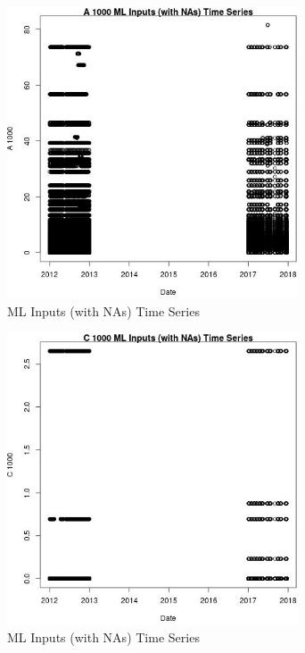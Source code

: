 \begin{figure} 
\centering  
\includegraphics[width=0.77\textwidth]{Code_Outputs/Report_ML_input_PM25_Step4_part_e_de_duplicated_aves_compiled_2019-05-14wNAs_A_1000vDate.jpg} 
\caption{\label{fig:Report_ML_input_PM25_Step4_part_e_de_duplicated_aves_compiled_2019-05-14wNAsA_1000vDate}ML Inputs (with NAs) Time Series} 
\end{figure} 
 

\begin{figure} 
\centering  
\includegraphics[width=0.77\textwidth]{Code_Outputs/Report_ML_input_PM25_Step4_part_e_de_duplicated_aves_compiled_2019-05-14wNAs_C_1000vDate.jpg} 
\caption{\label{fig:Report_ML_input_PM25_Step4_part_e_de_duplicated_aves_compiled_2019-05-14wNAsC_1000vDate}ML Inputs (with NAs) Time Series} 
\end{figure} 
 

